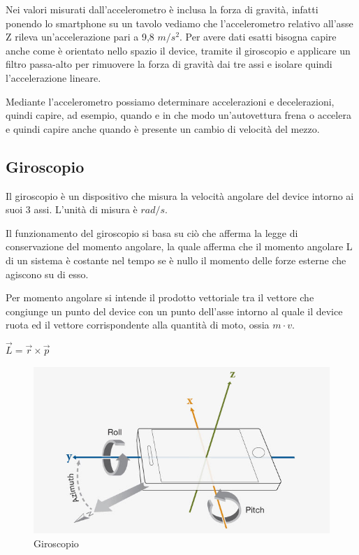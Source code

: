 \documentclass[12pt,a4paper,openright,twoside]{report}
\begin{document}
Nei valori misurati dall'accelerometro è inclusa la forza di gravità, infatti ponendo lo smartphone su un tavolo vediamo che l'accelerometro relativo all'asse Z rileva un'accelerazione pari a 9,8 $m/s^2$.
Per avere dati esatti bisogna capire anche come è orientato nello spazio il device, tramite il giroscopio e applicare un filtro passa-alto per rimuovere la forza di gravità dai tre assi e isolare quindi l'accelerazione lineare.

Mediante l'accelerometro possiamo determinare accelerazioni e decelerazioni, quindi capire, ad esempio, quando e in che modo un'autovettura frena o accelera e quindi capire anche quando è presente un cambio di velocità del mezzo. 

\subsection{Giroscopio}
Il giroscopio è un dispositivo che misura la velocità angolare del device intorno ai suoi 3 assi. L'unità di misura è $rad/s$. 

Il funzionamento del giroscopio si basa su ciò che afferma la legge di conservazione del momento angolare, la quale afferma che il momento angolare L di un sistema è costante nel tempo se è nullo il momento delle forze esterne che agiscono su di esso.

Per momento angolare si intende il prodotto vettoriale tra il vettore che congiunge un punto del device con un punto dell'asse intorno al quale il device ruota ed il vettore corrispondente alla quantità di moto, ossia $m \cdot v$.
\begin{center}
$\overrightarrow{L} =  \overrightarrow{r} \times \overrightarrow{p}$
\end{center}

\begin{figure}[h!]
\centering 
\includegraphics[scale=0.6]{fig6} 
\caption{Giroscopio} 
\end{figure}
\end{document}
